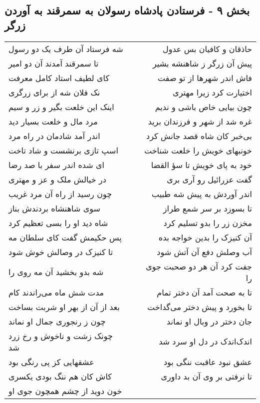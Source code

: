 \begin{center}
\section*{بخش ۹ - فرستادن پادشاه رسولان به سمرقند به آوردن زرگر}
\label{sec:sh009}
\begin{longtable}{l p{0.5cm} r}
شه فرستاد آن طرف یک دو رسول
&&
حاذقان و کافیان بس عدول
\\
تا سمرقند آمدند آن دو امیر
&&
پیش آن زرگر ز شاهنشه بشیر
\\
کای لطیف استاد کامل معرفت
&&
فاش اندر شهرها از تو صفت
\\
نک فلان شه از برای زرگری
&&
اختیارت کرد زیرا مهتری
\\
اینک این خلعت بگیر و زر و سیم
&&
چون بیایی خاص باشی و ندیم
\\
مرد مال و خلعت بسیار دید
&&
غره شد از شهر و فرزندان برید
\\
اندر آمد شادمان در راه مرد
&&
بی‌خبر کان شاه قصد جانش کرد
\\
اسپ تازی برنشست و شاد تاخت
&&
خونبهای خویش را خلعت شناخت
\\
ای شده اندر سفر با صد رضا
&&
خود به پای خویش تا سؤ القضا
\\
در خیالش ملک و عز و مهتری
&&
گفت عزرائیل رو آری بری
\\
چون رسید از راه آن مرد غریب
&&
اندر آوردش به پیش شه طبیب
\\
سوی شاهنشاه بردندش بناز
&&
تا بسوزد بر سر شمع طراز
\\
شاه دید او را بسی تعظیم کرد
&&
مخزن زر را بدو تسلیم کرد
\\
پس حکیمش گفت کای سلطان مه
&&
آن کنیزک را بدین خواجه بده
\\
تا کنیزک در وصالش خوش شود
&&
آب وصلش دفع آن آتش شود
\\
شه بدو بخشید آن مه روی را
&&
جفت کرد آن هر دو صحبت جوی را
\\
مدت شش ماه می‌راندند کام
&&
تا به صحت آمد آن دختر تمام
\\
بعد از آن از بهر او شربت بساخت
&&
تا بخورد و پیش دختر می‌گداخت
\\
چون ز رنجوری جمال او نماند
&&
جان دختر در وبال او نماند
\\
چونک زشت و ناخوش و رخ زرد شد
&&
اندک‌اندک در دل او سرد شد
\\
عشقهایی کز پی رنگی بود
&&
عشق نبود عاقبت ننگی بود
\\
کاش کان هم ننگ بودی یکسری
&&
تا نرفتی بر وی آن بد داوری
\\
خون دوید از چشم همچون جوی او

\end{longtable}
\end{center}
